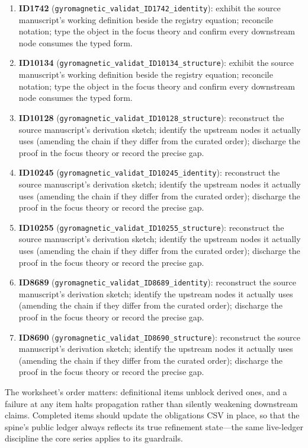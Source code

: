 \documentclass[11pt]{article}
\theoremstyle{remark}
\begin{document}
\begin{enumerate}
\item \textbf{ID1742} (\texttt{gyromagnetic\_validat\_ID1742\_identity}): exhibit the source manuscript's working definition beside the registry equation; reconcile notation; type the object in the focus theory and confirm every downstream node consumes the typed form.
\item \textbf{ID10134} (\texttt{gyromagnetic\_validat\_ID10134\_structure}): exhibit the source manuscript's working definition beside the registry equation; reconcile notation; type the object in the focus theory and confirm every downstream node consumes the typed form.
\item \textbf{ID10128} (\texttt{gyromagnetic\_validat\_ID10128\_structure}): reconstruct the source manuscript's derivation sketch; identify the upstream nodes it actually uses (amending the chain if they differ from the curated order); discharge the proof in the focus theory or record the precise gap.
\item \textbf{ID10245} (\texttt{gyromagnetic\_validat\_ID10245\_identity}): reconstruct the source manuscript's derivation sketch; identify the upstream nodes it actually uses (amending the chain if they differ from the curated order); discharge the proof in the focus theory or record the precise gap.
\item \textbf{ID10255} (\texttt{gyromagnetic\_validat\_ID10255\_structure}): reconstruct the source manuscript's derivation sketch; identify the upstream nodes it actually uses (amending the chain if they differ from the curated order); discharge the proof in the focus theory or record the precise gap.
\item \textbf{ID8689} (\texttt{gyromagnetic\_validat\_ID8689\_identity}): reconstruct the source manuscript's derivation sketch; identify the upstream nodes it actually uses (amending the chain if they differ from the curated order); discharge the proof in the focus theory or record the precise gap.
\item \textbf{ID8690} (\texttt{gyromagnetic\_validat\_ID8690\_structure}): reconstruct the source manuscript's derivation sketch; identify the upstream nodes it actually uses (amending the chain if they differ from the curated order); discharge the proof in the focus theory or record the precise gap.
\end{enumerate}

The worksheet's order matters: definitional items unblock derived ones, and a failure at any item halts propagation rather than silently weakening downstream claims. Completed items should update the obligations CSV in place, so that the spine's public ledger always reflects its true refinement state---the same live-ledger discipline the core series applies to its guardrails.
\end{document}
